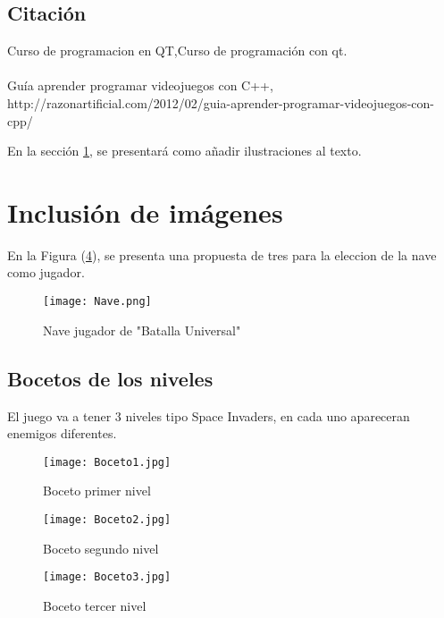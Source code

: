 \documentclass{article}
\begin{document}
\subsection{Citación}


Curso de programacion en QT,Curso de programación con qt.\\\\

Guía aprender programar videojuegos con C++, http://razonartificial.com/2012/02/guia-aprender-programar-videojuegos-con-cpp/



En la sección \ref{imagenes}, se presentará como añadir ilustraciones al texto.

\section{Inclusión de imágenes} \label{imagenes}

En la Figura (\ref{fig:cpplogo}), se presenta una propuesta de tres para la eleccion de la nave como jugador.




\begin{figure}[h]
\texttt{[image: Nave.png]}
\centering
\caption{Nave jugador de "Batalla Universal"}
\label{fig:cpplogo}
\end{figure}

\subsection{Bocetos de los niveles}
El juego va a tener 3 niveles tipo Space Invaders, en cada uno apareceran enemigos diferentes.

\begin{figure}[h]
\texttt{[image: Boceto1.jpg]}
\centering
\caption{Boceto primer nivel}
\label{fig:cpplogo}
\end{figure}

\begin{figure}[h]
\texttt{[image: Boceto2.jpg]}
\centering
\caption{Boceto segundo nivel}
\label{fig:cpplogo}
\end{figure}

\begin{figure}[h]
\texttt{[image: Boceto3.jpg]}
\centering
\caption{Boceto tercer nivel}
\label{fig:cpplogo}
\end{figure}




\end{document}
